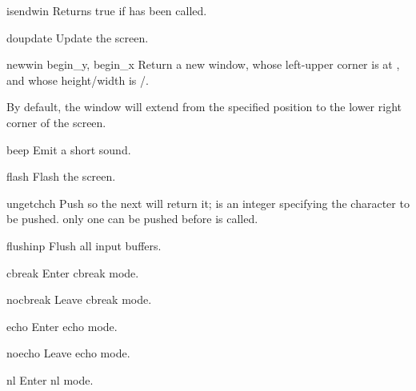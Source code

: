 \begin{funcdesc}{isendwin}{}
Returns true if  has been called.
\end{funcdesc}

\begin{funcdesc}{doupdate}{}
Update the screen.
\end{funcdesc}

\begin{funcdesc}{newwin}{ begin_y, begin_x}
Return a new window, whose left-upper corner is at 
, and whose height/width is 
/.  

By default, the window will extend from the 
specified position to the lower right corner of the screen.
\end{funcdesc}

\begin{funcdesc}{beep}{}
Emit a short sound.
\end{funcdesc}

\begin{funcdesc}{flash}{}
Flash the screen.
\end{funcdesc}

\begin{funcdesc}{ungetch}{ch}
Push  so the next  will return it;  is 
an integer specifying the character to be pushed.
 only one  can be pushed before 
is called.
\end{funcdesc}

\begin{funcdesc}{flushinp}{}
Flush all input buffers.
\end{funcdesc}

\begin{funcdesc}{cbreak}{}
Enter cbreak mode.
\end{funcdesc}

\begin{funcdesc}{nocbreak}{}
Leave cbreak mode.
\end{funcdesc}

\begin{funcdesc}{echo}{}
Enter echo mode.
\end{funcdesc}

\begin{funcdesc}{noecho}{}
Leave echo mode.
\end{funcdesc}

\begin{funcdesc}{nl}{}
Enter nl mode.
\end{funcdesc}

